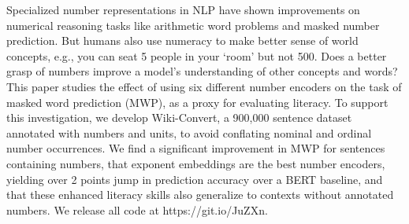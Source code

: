 Specialized number representations in NLP have shown improvements on numerical reasoning tasks like arithmetic word problems and masked number prediction. But humans also use numeracy to make better sense of world concepts, e.g., you can seat 5 people in your `room' but not 500. Does a better grasp of numbers improve a model's understanding of other concepts and words? This paper studies the effect of using six different number encoders on the task of masked word prediction (MWP), as a proxy for evaluating literacy. To support this investigation, we develop Wiki-Convert, a 900,000 sentence dataset annotated with numbers and units, to avoid conflating nominal and ordinal number occurrences. We find a significant improvement in MWP for sentences containing numbers, that exponent embeddings are the best number encoders, yielding over 2 points jump in prediction accuracy over a BERT baseline, and that these enhanced literacy skills also generalize to contexts without annotated numbers. We release all code at https://git.io/JuZXn.
